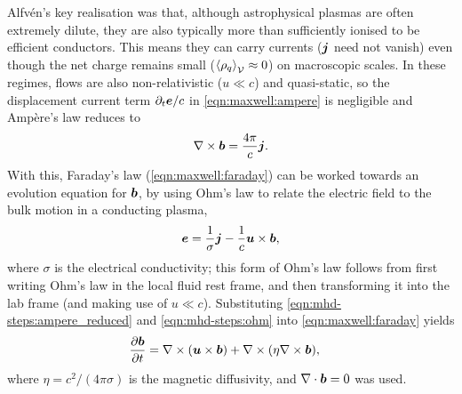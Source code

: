 Alfv\'en's key realisation was that, although astrophysical plasmas are often extremely dilute, they are also typically more than sufficiently ionised to be efficient conductors. This means they can carry currents ($\bm{j}$ need not vanish) even though the net charge remains small ($\left\langle \rho_q \right\rangle_{\mathcal{V}} \approx 0$) on macroscopic scales. In these regimes, flows are also non-relativistic ($u \ll c$) and quasi-static, so the displacement current term $\partial _t \bm{e} / c$ in \autoref{eqn:maxwell:ampere} is negligible and Amp\`ere's law reduces to
\begin{align}
    \nabla \times \bm{b}
        = \frac{4\pi}{c} \bm{j}
        . \label{eqn:mhd-steps:ampere_reduced}
\end{align}
With this, Faraday's law (\autoref{eqn:maxwell:faraday}) can be worked towards an evolution equation for $\bm{b}$, by using Ohm's law to relate the electric field to the bulk motion in a conducting plasma,
\begin{align}
    \bm{e}
        = \frac{1}{\sigma} \bm{j} - \frac{1}{c} \bm{u}\times\bm{b}
        ,
    \label{eqn:mhd-steps:ohm}
\end{align}
where $\sigma$ is the electrical conductivity; this form of Ohm's law follows from first writing Ohm's law in the local fluid rest frame, and then transforming it into the lab frame (and making use of $u \ll c$). Substituting \autoref{eqn:mhd-steps:ampere_reduced} and \autoref{eqn:mhd-steps:ohm} into \autoref{eqn:maxwell:faraday} yields
\begin{align}
    \frac{\partial \bm{b}}{\partial t}
        &= \nabla \times (\bm{u}\times\bm{b})
            + \nabla \times (\eta \nabla \times \bm{b})
            , \label{eqn:mhd-steps:induction}
\end{align}
where $\eta = c^2/(4\pi\sigma)$ is the magnetic diffusivity, and $\nabla \cdot \bm{b} = 0$ was used.

